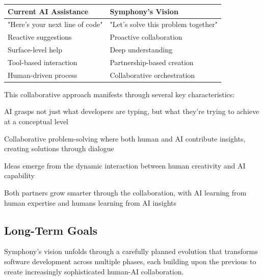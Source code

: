 \begin{center}
\begin{tabular}{@{}ll@{}}
\toprule
\textbf{Current AI Assistance} & \textbf{Symphony's Vision} \\
\midrule
"Here's your next line of code" & "Let's solve this problem together" \\
Reactive suggestions & Proactive collaboration \\
Surface-level help & Deep understanding \\
Tool-based interaction & Partnership-based creation \\
Human-driven process & Collaborative orchestration \\
\bottomrule
\end{tabular}
\label{tab:assistance-vs-collaboration}
\end{center}

This collaborative approach manifests through several key characteristics:

\begin{description}[leftmargin=3.5cm,labelwidth=3cm]
    \item[\textbf{Understanding Intent}] AI grasps not just what developers are typing, but what they're trying to achieve at a conceptual level
    
    \item[\textbf{Shared Reasoning}] Collaborative problem-solving where both human and AI contribute insights, creating solutions through dialogue
    
    \item[\textbf{Creative Synthesis}] Ideas emerge from the dynamic interaction between human creativity and AI capability
    
    \item[\textbf{Mutual Learning}] Both partners grow smarter through the collaboration, with AI learning from human expertise and humans learning from AI insights
\end{description}

\subsection{Long-Term Goals}
\label{subsec:long-term-goals}

Symphony's vision unfolds through a carefully planned evolution that transforms software development across multiple phases, each building upon the previous to create increasingly sophisticated human-AI collaboration.

